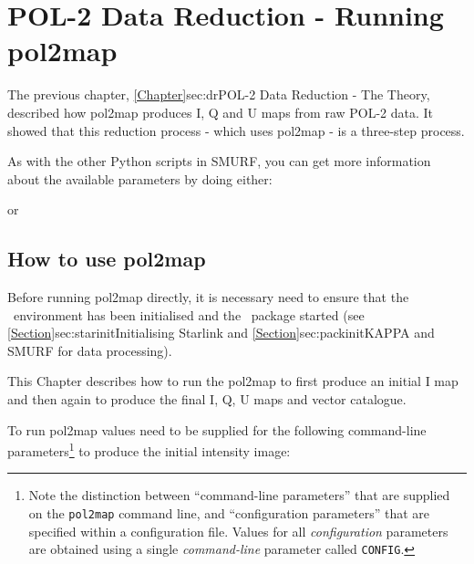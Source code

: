 \chapter{POL-2 Data Reduction - Running pol2map}
\label{sec:rundr}

The previous chapter, \cref{Chapter}{sec:dr}{POL-2 Data Reduction - The Theory}, described how pol2map produces I, Q and U maps from raw POL-2 data.
It showed that this reduction process - which uses pol2map - is a three-step process.

As with the other Python scripts in SMURF, you can get more information about the available
parameters by doing either:
\begin{terminalv}
\end{terminalv}
or
\begin{terminalv}
\end{terminalv}

\section{How to use pol2map}

Before running pol2map directly, it is necessary need to ensure that the \starlink\ environment has been
initialised and the \smurf\ package started (see
\cref{Section}{sec:starinit}{Initialising Starlink} and
\cref{Section}{sec:packinit}{KAPPA and SMURF for data processing}).

This Chapter describes how to run the pol2map to first produce an initial I map
and then again to produce the final I, Q, U maps and vector catalogue. 

To run pol2map values need to be supplied for the 
following command-line parameters\footnote{Note the distinction between
``command-line parameters'' that are
supplied on the \texttt{pol2map} command line, and ``configuration parameters''
that are specified within a configuration file. Values for all
\emph{configuration} parameters are obtained using a single \emph{command-line}
parameter called \texttt{CONFIG}.} to produce the initial intensity image:



